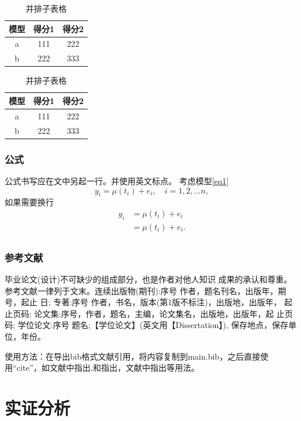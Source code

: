 \documentclass{SUFEThesis}
\begin{document}
\begin{table}[htbp]
\centering
\caption{并排子表格}
\label{tab:subtable}
{
\begin{tabular}{c|c|c}
\hline
模型 & 得分1 &得分2 \\
\hline
a &111 & 222 \\
b &222 & 333 \\
\hline
\end{tabular}
}
\hskip2cm
{
\begin{tabular}{c|c|c}
\hline
模型 & 得分1 &得分2 \\
\hline
a &111 & 222 \\
b &222 & 333 \\
\hline
\end{tabular}
}
\end{table}


\subsubsection{公式}
公式书写应在文中另起一行。并使用英文标点。
考虑模型\eqref{eq1}
\begin{equation}
y_i = \mu(t_i) + e_i, \quad i = 1,2,\dots n,
\label{eq1}
\end{equation}
如果需要换行
\begin{equation}
  \begin{aligned}
  y_i &= \mu(t_i) + e_i\\
      &= \mu(t_i) + e_i.\\
  \end{aligned}
\end{equation}

\subsubsection{参考文献}
毕业论文(设计)不可缺少的组成部分，也是作者对他人知识
成果的承认和尊重。参考文献一律列于文末。连续出版物(期刊):序号 作者，题名刊名，出版年，期号，起止 日;
专著:序号 作者，书名，版本(第1版不标注)，出版地，出版年， 起止页码; 论文集:序号，作者，题名，主编，论文集名，出版地，出版年，起 止页码;
学位论文:序号 题名;【学位论文】(英文用【Dissertation】),
保存地点，保存单位，年份。\par
使用方法：在导出bib格式文献引用，将内容复制到main.bib，之后直接使用“cite”，如文献中指出\cite{guegan2005can},\citet{guegan2005can}和\citet{dahlhaus1997}指出，文献中指出\cite{guegan2005can,dahlhaus1997}等用法。


\section{实证分析}
\end{document}
